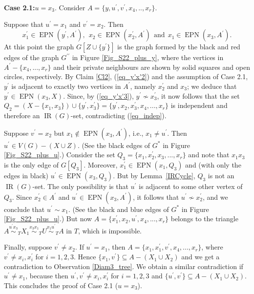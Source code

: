 \documentclass[12pt]{article}%
\begin{document}
\noindent\textbf{Case 2.1:\hspace{0.1in}}$u=x_{3}$. Consider $A=\{y,u^{\prime
},v^{\prime},x_{4},..,x_{r}\}$.

\noindent Suppose that $u^{\prime}=x_{1}$ and $v^{\prime}=x_{2}$. Then
\[
x_{1}^{\prime}\in\operatorname{EPN}(y^{\prime},A^{\prime}),\ \ x_{2}%
\in\operatorname{EPN}(x_{2}^{\prime},A^{\prime})\ \ \text{and}\ \ x_{1}%
\in\operatorname{EPN}(x_{3},A^{\prime}).
\]
At this point the graph $G[Z\cup\{y^{\prime}\}]$ is the graph formed by the
black and red edges of the graph $G^{\prime\prime}$ in Figure
\ref{Fig_S22_plus_y}, where the vertices in $A^{\prime}-\{x_{4},...,x_{r}\}$
and their private neighbours are shown by solid squares and open circles,
respectively. By Claim \ref{Cl2}, (\ref{eq_y'x'2}) and the assumption of Case
2.1, $y^{\prime}$ is adjacent to exactly two vertices in $A^{\prime}$, namely
$x_{2}^{\prime}$ and $x_{3}$; we deduce that $y^{\prime}\in\operatorname{EPN}%
(x_{3},X)$. Since, by (\ref{eq_y'x'3}), $y^{\prime}\nsim x_{3}^{\prime}$, it
now follows that the set $Q_{2}=(X-\{x_{1},x_{3}\})\cup\{y^{\prime}%
,x_{3}^{\prime}\}=\{y^{\prime},x_{2},x_{3}^{\prime},x_{4},...,x_{r}\}$ is
independent and therefore an $\operatorname{IR}(G)$-set, contradicting
(\ref{eq_indep}).

Suppose $v^{\prime}=x_{2}$ but $x_{1}\notin\operatorname{EPN}(x_{3},A^{\prime
})$, i.e., $x_{1}\neq u^{\prime}$. Then $u^{\prime}\in V(G)-(X\cup Z)$. (See
the black edges of $G^{\ast}$ in Figure \ref{Fig_S22_plus_u}.) Consider the
set $Q_{3}=\{x_{1},x_{2}^{\prime},x_{3},...,x_{r}\}$ and note that $x_{1}%
x_{3}$ is the only edge of $G[Q_{3}]$. Moreover, $x_{1}^{\prime}%
\in\operatorname{EPN}(x_{1},Q_{3})$ and (with only the edges in black)
$u^{\prime}\in\operatorname{EPN}(x_{3},Q_{3})$. But by Lemma~\ref{IRCycle},
$Q_{3}$ is not an $\operatorname{IR}(G)$-set. The only possibility is that
$u^{\prime}$ is adjacent to some other vertex of $Q_{3}$. Since $x_{2}%
^{\prime}\in A^{\prime}$ and $u^{\prime}\in\operatorname{EPN}(x_{3},A^{\prime
})$, it follows that $u^{\prime}\nsim x_{2}^{\prime}$, and we conclude that
$u^{\prime}\sim x_{1}$. (See the black and blue edges of $G^{\ast}$ in Figure
\ref{Fig_S22_plus_u}.) But now $A=\{x_{1}^{\prime},x_{2},u^{\prime}%
,x_{4},...,x_{r}\}$ belongs to the triangle $A\overset{u^{\prime}x_{3}}{\sim
}_{T}X_{1}\overset{x_{3}x_{1}}{\sim}_{T}U\overset{x_{1}u^{\prime}}{\sim}_{T}A$
in $T$, which is impossible.

Finally, suppose $v^{\prime}\neq x_{2}$. If $u^{\prime}=x_{1}$, then
$A=\{x_{1},x_{1}^{\prime},v^{\prime},x_{4},...,x_{r}\}$, where $v^{\prime}\neq
x_{i},x_{i}^{\prime}$ for $i=1,2,3$. Hence $\{x_{1},v^{\prime}\}\subseteq
A-(X_{1}\cup X_{2})$ and we get a contradiction to Observation
\ref{Diam3_tree}. We obtain a similar contradiction if $u^{\prime}\neq x_{1}$,
because then $u^{\prime},v^{\prime}\neq x_{i},x_{i}^{\prime}$ for $i=1,2,3$
and $\{u^{\prime},v^{\prime}\}\subseteq A-(X_{1}\cup X_{2})$. This concludes
the proof of Case 2.1 ($u=x_{3}$).\smallskip%
\end{document}
